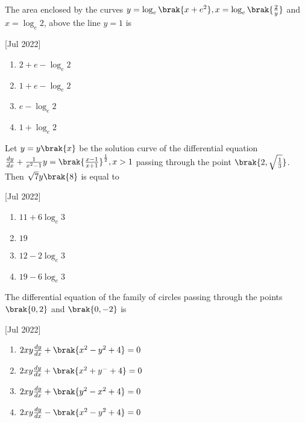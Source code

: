     \item The area enclosed by the curves $y=\log_e\brak{x+e^2},x=\log_e\brak{\frac{2}{y}}$ and $x=\log_e2$, above the line $y=1$ is
    
    \hfill[Jul 2022]

        \begin{multicols}{4}
            \begin{enumerate}
                \item $2+e-\log_e2$
                \item $1+e-\log_e2$
                \item $e-\log_e2$
                \item $1+\log_e2$
            \end{enumerate}
        \end{multicols}
        
    \item Let $y=y\brak{x}$ be the solution curve of the differential equation $\frac{dy}{dx}+\frac{1}{x^2-1}y=\brak{\frac{x-1}{x+1}}^{\frac{1}{2}},x>1$ passing through the point $\brak{2,\sqrt{\frac{1}{3}}}$. Then $\sqrt{7}y\brak{8}$ is equal to
    
    \hfill[Jul 2022]

        \begin{multicols}{4}
            \begin{enumerate}
                \item $11+6\log_e3$
                \item $19$
                \item $12-2\log_e3$
                \item $19-6\log_e3$
            \end{enumerate}
        \end{multicols}

    \item The differential equation of the family of circles passing through the points $\brak{0,2}$ and $\brak{0,-2}$ is
    
    \hfill[Jul 2022]

        \begin{multicols}{2}
            \begin{enumerate}
                \item $2xy\frac{dy}{dx}+\brak{x^2-y^2+4}=0$
                \item $2xy\frac{dy}{dx}+\brak{x^2+y^-+4}=0$
                \item $2xy\frac{dy}{dx}+\brak{y^2-x^2+4}=0$
                \item $2xy\frac{dy}{dx}-\brak{x^2-y^2+4}=0$
            \end{enumerate}
        \end{multicols}
        
